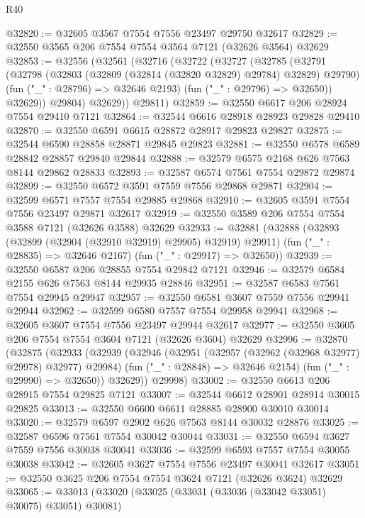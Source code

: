\begin{lexlean}{R40}
\begin{coremodule}
@32820 := @32605 @3567 @7554 @7556 @23497 @29750 @32617
@32829 := @32550 @3565 @206 @7554 @7554 @3564 @7121 (@32626 @3564) @32629
@32853 := @32556
    (@32561
      (@32716
        (@32722
          (@32727
            (@32785
              (@32791
                (@32798
                  (@32803 (@32809 (@32814 (@32820 @32829) @29784) @32829) @29790)
                  (fun ("_" : @28796) => @32646 @2193)
                  (fun ("_" : @29796) => @32650))
                @32629))
            @29804)
          @32629))
      @29811)
@32859 := @32550 @6617 @206 @28924 @7554 @29410 @7121
@32864 := @32544 @6616 @28918 @28923 @29828 @29410
@32870 := @32550 @6591 @6615 @28872 @28917 @29823 @29827
@32875 := @32544 @6590 @28858 @28871 @29845 @29823
@32881 := @32550 @6578 @6589 @28842 @28857 @29840 @29844
@32888 := @32579 @6575 @2168 @626 @7563 @8144 @29862 @28833
@32893 := @32587 @6574 @7561 @7554 @29872 @29874
@32899 := @32550 @6572 @3591 @7559 @7556 @29868 @29871
@32904 := @32599 @6571 @7557 @7554 @29885 @29868
@32910 := @32605 @3591 @7554 @7556 @23497 @29871 @32617
@32919 := @32550 @3589 @206 @7554 @7554 @3588 @7121 (@32626 @3588) @32629
@32933 := @32881
    (@32888
      (@32893 (@32899 (@32904 (@32910 @32919) @29905) @32919) @29911)
      (fun ("_" : @28835) => @32646 @2167)
      (fun ("_" : @29917) => @32650))
@32939 := @32550 @6587 @206 @28855 @7554 @29842 @7121
@32946 := @32579 @6584 @2155 @626 @7563 @8144 @29935 @28846
@32951 := @32587 @6583 @7561 @7554 @29945 @29947
@32957 := @32550 @6581 @3607 @7559 @7556 @29941 @29944
@32962 := @32599 @6580 @7557 @7554 @29958 @29941
@32968 := @32605 @3607 @7554 @7556 @23497 @29944 @32617
@32977 := @32550 @3605 @206 @7554 @7554 @3604 @7121 (@32626 @3604) @32629
@32996 := @32870
    (@32875
      (@32933
        (@32939
          (@32946
            (@32951 (@32957 (@32962 (@32968 @32977) @29978) @32977) @29984)
            (fun ("_" : @28848) => @32646 @2154)
            (fun ("_" : @29990) => @32650))
          @32629))
      @29998)
@33002 := @32550 @6613 @206 @28915 @7554 @29825 @7121
@33007 := @32544 @6612 @28901 @28914 @30015 @29825
@33013 := @32550 @6600 @6611 @28885 @28900 @30010 @30014
@33020 := @32579 @6597 @2902 @626 @7563 @8144 @30032 @28876
@33025 := @32587 @6596 @7561 @7554 @30042 @30044
@33031 := @32550 @6594 @3627 @7559 @7556 @30038 @30041
@33036 := @32599 @6593 @7557 @7554 @30055 @30038
@33042 := @32605 @3627 @7554 @7556 @23497 @30041 @32617
@33051 := @32550 @3625 @206 @7554 @7554 @3624 @7121 (@32626 @3624) @32629
@33065 := @33013
    (@33020
      (@33025 (@33031 (@33036 (@33042 @33051) @30075) @33051) @30081)

\end{coremodule}
\end{lexlean}
